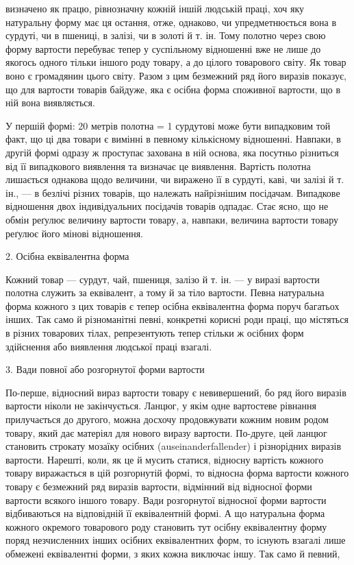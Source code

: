 визначено як працю, рівнозначну кожній іншій людській праці,
хоч яку натуральну форму має ця остання, отже, однаково, чи
упредметнюється вона в сурдуті, чи в пшениці, в залізі, чи в
золоті й т. ін. Тому полотно через свою форму вартости перебуває
тепер у суспільному відношенні вже не лише до якогось одного
тільки іншого роду товару, а до цілого товарового світу. Як
товар воно є громадянин цього світу. Разом з цим безмежний ряд
його виразів показує, що для вартости товарів байдуже, яка є
осібна форма споживної вартости, що в ній вона виявляється.

У першій формі: 20 метрів полотна = 1 сурдутові може бути
випадковим той факт, що ці два товари є вимінні в певному кількісному
відношенні. Навпаки, в другій формі одразу ж проступає
захована в ній основа, яка посутньо різниться від її випадкового
виявлення та визначає це виявлення. Вартість полотна лишається
однакова щодо величини, чи виражено її в сурдуті, каві, чи
залізі й т. ін., — в безлічі різних товарів, що належать найрізнішим
посідачам. Випадкове відношення двох індивідуальних посідачів
товарів одпадає. Стає ясно, що не обмін реґулює величину
вартости товару, а, навпаки, величина вартости товару реґулює
його мінові відношення.

2. Осібна еквівалентна форма

Кожний товар — сурдут, чай, пшениця, залізо й т. ін. — у
виразі вартости полотна служить за еквівалент, а тому й за тіло
вартости. Певна натуральна форма кожного з цих товарів є тепер
осібна еквівалентна форма поруч багатьох інших. Так само й
різноманітні певні, конкретні корисні роди праці, що містяться
в різних товарових тілах, репрезентують тепер стільки ж осібних
форм здійснення або виявлення людської праці взагалі.

3. Вади повної або розгорнутої форми вартости

По-перше, відносний вираз вартости товару є невивершений,
бо ряд його виразів вартости ніколи не закінчується. Ланцюг, у
якім одне вартостеве рівнання прилучається до другого, можна
досхочу продовжувати кожним новим родом товару, який дає
матеріял для нового виразу вартости. По-друге, цей ланцюг становить
строкату мозаїку осібних (auseinanderfallender) і різнорідних
виразів вартости. Нарешті, коли, як це й мусить статися,
відносну вартість кожного товару виражається в цій розгорнутій
формі, то відносна форма вартости кожного товару є безмежний
ряд виразів вартости, відмінний від відносної форми вартости
всякого іншого товару. Вади розгорнутої відносної форми вартости
відбиваються на відповідній її еквівалентній формі. А що
натуральна форма кожного окремого товарового роду становить
тут осібну еквівалентну форму поряд незчисленних інших осібних
еквівалентних форм, то існують взагалі лише обмежені еквівалентні
форми, з яких кожна виключає іншу. Так само й певний,
